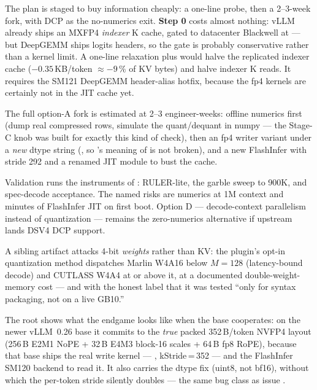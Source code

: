 \begin{sloppypar}
The plan is staged to buy information cheaply: a one-line probe, then a
2--3-week fork, with DCP as the no-numerics exit. \textbf{Step 0} costs
almost nothing: vLLM already ships an MXFP4 \emph{indexer} K cache, gated to
datacenter Blackwell at  --- but DeepGEMM ships
 logits headers, so the gate is probably conservative
rather than a kernel limit. A one-line relaxation plus
 would halve the replicated indexer cache
($-0.35$\,KB/token $\approx -9\,\%$ of KV bytes) and halve indexer K reads.
It requires the SM121 DeepGEMM header-alias hotfix, because the fp4 kernels
are certainly not in the JIT cache yet.

The full option-A fork is estimated at 2--3 engineer-weeks: offline
numerics first (dump real compressed rows, simulate the quant/dequant in
numpy --- the Stage-C knob
 was built for exactly this
kind of check), then an fp4 writer variant under a \emph{new} dtype string
(, so 's meaning of  is
not broken), and a new FlashInfer  with stride 292 and
a renamed JIT module to bust the cache.

Validation runs the instruments of : RULER-lite, the
garble sweep to 900K, and spec-decode acceptance. The named risks are
numerics at 1M context and minutes of FlashInfer JIT on first boot. Option
D --- decode-context parallelism instead of quantization --- remains the
zero-numerics alternative if upstream lands DSV4 DCP support.
\end{sloppypar}

\begin{hbnote}
A sibling artifact attacks 4-bit \emph{weights} rather than KV: the
 plugin's opt-in 
quantization method dispatches Marlin W4A16 below $M{=}128$ (latency-bound
decode) and CUTLASS W4A4 at or above it, at a documented
double-weight-memory cost --- and with the honest label that it was tested
``only for syntax packaging, not on a live GB10.''
\end{hbnote}

\begin{sloppypar}
The root  shows what
the endgame looks like when the base cooperates: on the newer vLLM~0.26 base
it commits to the \emph{true} packed 352\,B/token NVFP4 layout (256\,B E2M1
NoPE + 32\,B E4M3 block-16 scales + 64\,B fp8 RoPE), because that base ships
the real write kernel --- ,
kStride\,=\,352 --- and the FlashInfer SM120 backend to read it. It also
carries the  dtype fix (uint8, not bf16), without
which the per-token stride silently doubles --- the same bug class as issue
.
\end{sloppypar}

